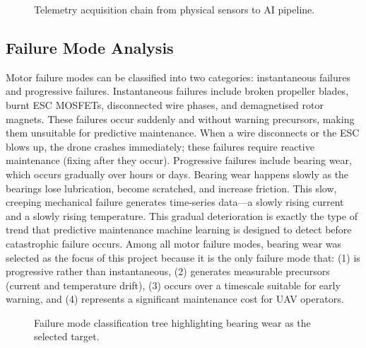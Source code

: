 \begin{figure}[H]
\centering
\caption{Telemetry acquisition chain from physical sensors to AI pipeline.}
\label{fig:telemetry_chain}
\end{figure}

\subsection{Failure Mode Analysis}

Motor failure modes can be classified into two categories: instantaneous failures and progressive failures. Instantaneous failures include broken propeller blades, burnt ESC MOSFETs, disconnected wire phases, and demagnetised rotor magnets. These failures occur suddenly and without warning precursors, making them unsuitable for predictive maintenance. When a wire disconnects or the ESC blows up, the drone crashes immediately; these failures require reactive maintenance (fixing after they occur). Progressive failures include bearing wear, which occurs gradually over hours or days. Bearing wear happens slowly as the bearings lose lubrication, become scratched, and increase friction. This slow, creeping mechanical failure generates time-series data—a slowly rising current and a slowly rising temperature. This gradual deterioration is exactly the type of trend that predictive maintenance machine learning is designed to detect before catastrophic failure occurs. Among all motor failure modes, bearing wear was selected as the focus of this project because it is the only failure mode that: (1) is progressive rather than instantaneous, (2) generates measurable precursors (current and temperature drift), (3) occurs over a timescale suitable for early warning, and (4) represents a significant maintenance cost for UAV operators.

\begin{figure}[H]
\centering
\caption{Failure mode classification tree highlighting bearing wear as the selected target.}
\label{fig:failure_modes}
\end{figure}

